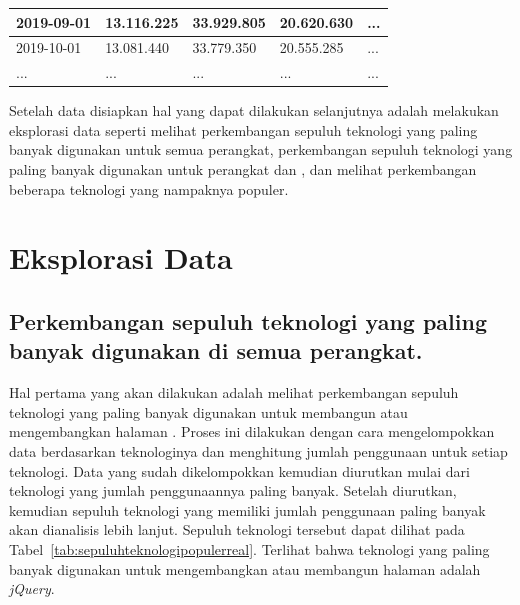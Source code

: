 \begin{table}[H]
\begin{tabular}{lllll}
\multicolumn{1}{|l|}{2019-09-01} & \multicolumn{1}{l|}{13.116.225} & \multicolumn{1}{l|}{33.929.805} & \multicolumn{1}{l|}{20.620.630} & \multicolumn{1}{l|}{...} \\ \hline
\multicolumn{1}{|l|}{2019-10-01} & \multicolumn{1}{l|}{13.081.440} & \multicolumn{1}{l|}{33.779.350} & \multicolumn{1}{l|}{20.555.285} & \multicolumn{1}{l|}{...} \\ \hline
\multicolumn{1}{|l|}{...} & \multicolumn{1}{l|}{...} & \multicolumn{1}{l|}{...} & \multicolumn{1}{l|}{...} & \multicolumn{1}{l|}{...} \\ \hline
\end{tabular}
\end{table}

Setelah data disiapkan hal yang dapat dilakukan selanjutnya adalah melakukan eksplorasi data seperti melihat perkembangan sepuluh teknologi yang paling banyak digunakan untuk semua perangkat, perkembangan sepuluh teknologi yang paling banyak digunakan untuk perangkat \mobile dan \desktop, dan melihat perkembangan beberapa teknologi yang nampaknya populer.

\section{Eksplorasi Data}
\label{sec:eksplor}

\subsection{Perkembangan sepuluh teknologi yang paling banyak digunakan di semua perangkat.}
\label{subsec:perkembangansepuluhteknologi}

Hal pertama yang akan dilakukan adalah melihat perkembangan sepuluh teknologi yang paling banyak digunakan untuk membangun atau mengembangkan halaman \web. Proses ini dilakukan dengan cara mengelompokkan data berdasarkan teknologinya dan menghitung jumlah penggunaan untuk setiap teknologi. Data yang sudah dikelompokkan kemudian diurutkan mulai dari teknologi yang jumlah penggunaannya paling banyak. Setelah diurutkan, kemudian sepuluh teknologi yang memiliki jumlah penggunaan paling banyak akan dianalisis lebih lanjut. Sepuluh teknologi tersebut dapat dilihat pada Tabel~\ref{tab:sepuluhteknologipopulerreal}. Terlihat bahwa teknologi yang paling banyak digunakan untuk mengembangkan atau membangun halaman \web adalah \textit{jQuery}.

